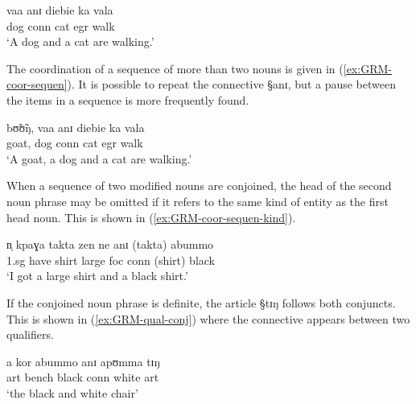\begin{exe}
 \ex\label{ex:GRM-coor-ani} 
 
 \gll vaa anɪ diebie ka vala \\
dog {\sc conn} cat {\sc  egr} walk\\
 \glt  `A dog and a cat are walking.'
\end{exe}

 The coordination of a sequence of
 more than two nouns is given in (\ref{ex:GRM-coor-sequen}). It is possible to
repeat the 
connective {\S anɪ}, but a pause between the items in a
sequence is more
frequently found. 

\begin{exe}
 \ex\label{ex:GRM-coor-sequen} 
 
 \gll  bʊ̃ʊ̃ŋ, vaa anɪ diebie ka vala \\
 goat,  dog {\sc conn} cat {\sc  egr} walk\\
 \glt   `A goat, a dog and a cat are walking.'
\end{exe}

When a sequence of  two  modified nouns are conjoined, the head of the second
noun phrase may be omitted if it refers to the same kind of entity as
the first head noun. This is shown in (\ref{ex:GRM-coor-sequen-kind}).


\begin{exe}
 \ex\label{ex:GRM-coor-sequen-kind}
 
 \gll n̩ kpaɣa takta zen ne anɪ (takta) abummo  \\
{\sc 1.sg} have shirt large  {\sc foc} {\sc conn} (shirt)  black \\
 \glt   `I got a large shirt and a black shirt.'
\end{exe}

If the conjoined noun phrase is definite, the article {\S tɪŋ}
follows both conjuncts. This is shown in (\ref{ex:GRM-qual-conj}) where the
connective appears between two qualifiers.

\begin{exe}
 \ex\label{ex:GRM-qual-conj}
 
 \gll   a kor abummo anɪ apʊmma tɪŋ\\
{\sc art}  bench black {\sc conn} white {\sc art} \\
 \glt   `the black and white chair'
\end{exe}



